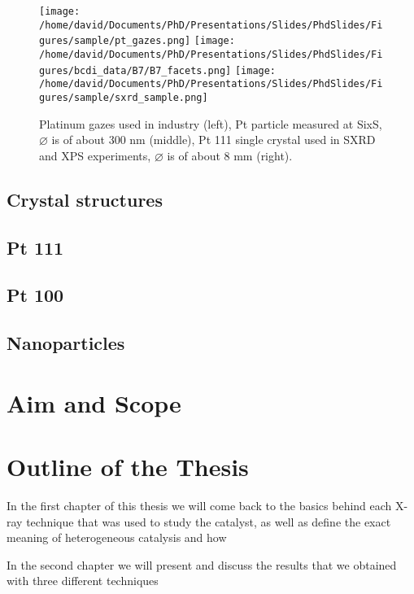 \begin{figure}[!htb]
    \centering
    \texttt{[image: /home/david/Documents/PhD/Presentations/Slides/PhdSlides/Figures/sample/pt\_gazes.png]}
    \texttt{[image: /home/david/Documents/PhD/Presentations/Slides/PhdSlides/Figures/bcdi\_data/B7/B7\_facets.png]}
    \texttt{[image: /home/david/Documents/PhD/Presentations/Slides/PhdSlides/Figures/sample/sxrd\_sample.png]}
    \caption{Platinum gazes used in industry (left), Pt particle measured at SixS, $\diameter$ is of about 300 nm (middle), Pt 111 single crystal used in SXRD and XPS experiments, $\diameter$ is of about 8 mm (right).}
\end{figure}

\subsection{Crystal structures}

\subsection{Pt 111}

\subsection{Pt 100}

\subsection{Nanoparticles}

\section{Aim and Scope}

\section{Outline of the Thesis}

In the first chapter of this thesis we will come back to the basics behind each X-ray technique that was used to study the catalyst, as well as define the exact meaning of heterogeneous catalysis and how

In the second chapter we will present and discuss the results that we obtained with three different techniques
